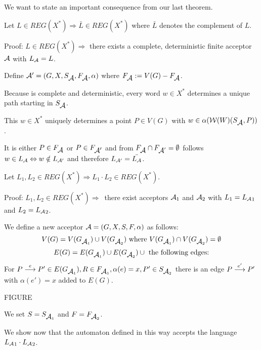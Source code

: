 We want to state an important consequence from our last theorem.

\begin{theorem}
Let $L \in REG(X^*) \Rightarrow \bar{L} \in REG(X^*)$ where $\bar{L}$ denotes
the complement of $L$.
\end{theorem}

Proof: $L \in REG(X^*) \Rightarrow $ there exists a complete, deterministic
finite acceptor $\mbox{$\mathcal{A}$}$ with $\mbox{$L_{\mathcal{A}}$} = L$.

Define $\mbox{$\mathcal{A'}$} = (G, X, S_{\mbox{$\mathcal{A}$}}, F_{\mbox{$\mathcal{A}$}}, \alpha)$ where $F_{\mbox{$\mathcal{A}$}} :=
V(G) - F_{\mbox{$\mathcal{A}$}}$.

Because  is complete and deterministic, every word $w \in X^*$ determines
a unique path starting in $S_{\mbox{$\mathcal{A}$}}$.

This $w \in X^*$ uniquely determines a point $P \in V(G)$ with $w \in
\alpha(\mbox{$\mathcal{W}(W)$}(S_{\mbox{$\mathcal{A}$}}, P))$.

It is either $P \in F_{\mbox{$\mathcal{A}$}}$ or $P \in F_{\mbox{$\mathcal{A'}$}}$ and from $F_{\mbox{$\mathcal{A}$}}
\cap F_{\mbox{$\mathcal{A}$}'} = \emptyset$ follows $w \in \mbox{$L_{\mathcal{A}}$} \Leftrightarrow w
\notin \mbox{$L_{\mathcal{A'}}$}$ and therefore $\mbox{$L_{\mathcal{A'}}$} = \bar{\mbox{$L_{\mathcal{A}}$}}$.

\begin{theorem}
Let $L_1, L_2 \in REG(X^*) \Rightarrow L_1 \cdot L_2 \in REG(X^*)$.
\end{theorem}

Proof: $L_1, L_2 \in REG(X^*) \Rightarrow$\ there exist acceptors $\mbox{$\mathcal{A}$}_1$ and
$\mbox{$\mathcal{A}$}_2$ with $L_1 = \mbox{$L_{\mathcal{A}}$}_1$ and $L_2 = \mbox{$L_{\mathcal{A}}$}_2$.

We define a new acceptor ${\mbox{$\mathcal{A}$}} = (G, X, S, F, \alpha)$ as follows:
\[ V(G) = V(G_{\mbox{$\mathcal{A}$}_1}) \cup V(G_{\mbox{$\mathcal{A}$}_2})\mbox{ where }V(G_{\mbox{$\mathcal{A}$}_1}) \cap
V(G_{\mbox{$\mathcal{A}$}_2}) = \emptyset \]
\[ E(G) = E(G_{\mbox{$\mathcal{A}$}_1}) \cup E(G_{\mbox{$\mathcal{A}$}_2}) \cup \mbox{ the following edges:}
\]
For $P \stackrel{e}{\longrightarrow} P' \in E(G_{\mbox{$\mathcal{A}$}_1}), R \in F_{\mbox{$\mathcal{A}$}_1}, \alpha(e) = x, P'
\in S_{\mbox{$\mathcal{A}$}_2}$ there is an edge $P \stackrel{e'}{\longrightarrow} P'$ with $\alpha(e') = x$ added
to $E(G)$.

FIGURE

We set $S = S_{\mbox{$\mathcal{A}$}_1}$ and $F = F_{\mbox{$\mathcal{A}$}_2}$.

We show now that the automaton defined in this way accepts the language
$\mbox{$L_{\mathcal{A}}$}_1 \cdot \mbox{$L_{\mathcal{A}}$}_2$.












































